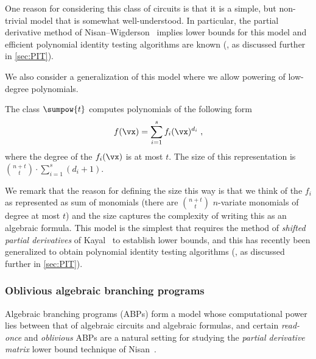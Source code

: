 \documentclass{toc}
\begin{document}
One reason for considering this class of circuits is that it is a simple, but non-trivial model that is somewhat well-understood.  In particular, the partial derivative method of Nisan--Wigderson~\cite{NisanWigderson96} implies lower bounds for this model and efficient polynomial identity testing algorithms are known (\cite{Saxena08,AgrawalSS13,ForbesShpilka13a,ForbesShpilka13b,ForbesSS14}, as discussed further in \autoref{sec:PIT}).

We also consider a generalization of this model where we allow powering of low-degree polynomials.

\begin{definition}\label{def:sumpowlowdeg}
        The class $\sumpow{t}$ computes polynomials of the following form
        \[
                f(\vx)=\sum_{i=1}^{s} f_i(\vx)^{d_i}
                \;,
        \]
  where the degree of the $f_i(\vx)$ is at most $t$. The size of this representation is $\binom{n+t}{t} \cdot \sum_{i=1}^{s}(d_i+1)$.
\end{definition}

We remark that the reason for defining the size this way is that we think of the $f_i$ as represented as sum of monomials (there are $\binom{n+t}{t}$ $n$-variate monomials of degree at most $t$) and the size captures the complexity of writing this as an algebraic formula. This model is the simplest that requires the method of \emph{shifted partial derivatives} of Kayal~\cite{Kayal12,GuptaKKS14} to establish lower bounds, and this has recently been generalized to obtain polynomial identity testing algorithms (\cite{Forbes15}, as discussed further in \autoref{sec:PIT}).

%

\subsubsection{Oblivious algebraic branching programs}

Algebraic branching programs (ABPs) form a model whose computational power lies between that of algebraic circuits and algebraic formulas, and certain \emph{read-once} and \emph{oblivious} ABPs are a natural setting for studying the \emph{partial derivative matrix} lower bound technique of Nisan~\cite{Nisan91}.
\end{document}
